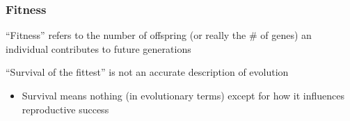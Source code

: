 \documentclass[10pt]{beamer}
\begin{document}
\begin{frame}[t]
\frametitle{Fitness}
\vspace{0.25cm}
	``Fitness'' refers to the number of offspring (or really the \# of genes) an individual contributes to future generations\\
	
	\vspace{1.0cm}
	
	``Survival of the fittest'' is not an accurate description of evolution\\
		\smallskip
		\begin{itemize}
			\item Survival means nothing (in evolutionary terms) except for how it influences reproductive success
		\end{itemize}
\end{frame}
\end{document}
